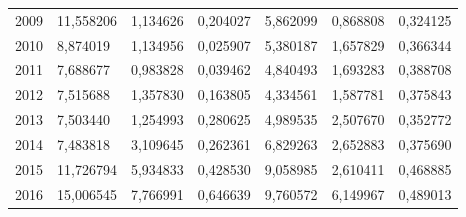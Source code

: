 \begin{table}
\begin{tabular}{p{1cm}p{2cm}p{2cm}p{2cm}p{2cm}p{2cm}p{2cm}}
 2009 &                                   11,558206 &                            1,134626 &                             0,204027 &                    5,862099 & 0,868808 &                         0,324125 \\
 2010 &                                    8,874019 &                            1,134956 &                             0,025907 &                    5,380187 & 1,657829 &                         0,366344 \\
 2011 &                                    7,688677 &                            0,983828 &                             0,039462 &                    4,840493 & 1,693283 &                         0,388708 \\
 2012 &                                    7,515688 &                            1,357830 &                             0,163805 &                    4,334561 & 1,587781 &                         0,375843 \\
 2013 &                                    7,503440 &                            1,254993 &                             0,280625 &                    4,989535 & 2,507670 &                         0,352772 \\
 2014 &                                    7,483818 &                            3,109645 &                             0,262361 &                    6,829263 & 2,652883 &                         0,375690 \\
 2015 &                                   11,726794 &                            5,934833 &                             0,428530 &                    9,058985 & 2,610411 &                         0,468885 \\
 2016 &                                   15,006545 &                            7,766991 &                             0,646639 &                    9,760572 & 6,149967 &                         0,489013 \\
\bottomrule
\end{tabular}
\end{table}
